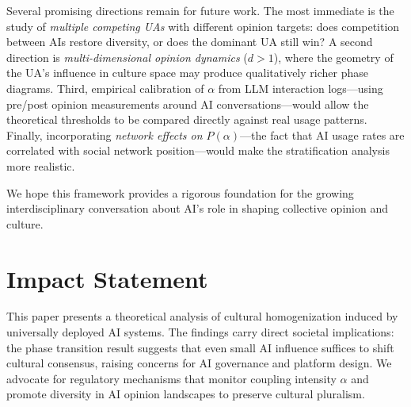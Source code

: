 \documentclass{article}
\theoremstyle{plain}
\theoremstyle{definition}
\theoremstyle{remark}
\begin{document}
Several promising directions remain for future work.
The most immediate is the study of \emph{multiple competing UAs} with
different opinion targets: does competition between AIs restore diversity,
or does the dominant UA still win?
A second direction is \emph{multi-dimensional opinion dynamics}
($d>1$), where the geometry of the UA's influence in culture space may
produce qualitatively richer phase diagrams.
Third, empirical calibration of $\alpha$ from LLM interaction logs---using
pre/post opinion measurements around AI conversations---would allow
the theoretical thresholds to be compared directly against real usage patterns.
Finally, incorporating \emph{network effects on $P(\alpha)$}---the fact
that AI usage rates are correlated with social network position---would
make the stratification analysis more realistic.

We hope this framework provides a rigorous foundation for the growing
interdisciplinary conversation about AI's role in shaping collective
opinion and culture.

\section*{Impact Statement}

This paper presents a theoretical analysis of cultural homogenization
induced by universally deployed AI systems. The findings carry direct
societal implications: the phase transition result suggests that even
small AI influence suffices to shift cultural consensus, raising concerns
for AI governance and platform design. We advocate for regulatory
mechanisms that monitor coupling intensity $\alpha$ and promote diversity
in AI opinion landscapes to preserve cultural pluralism.
\end{document}
